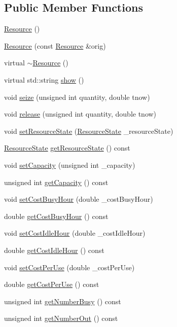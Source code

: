 \subsection*{Public Member Functions}
\begin{DoxyCompactItemize}
\item 
\hyperlink{class_resource_a5a87b23dc0327bbf8d53c6f38f637f48}{Resource} ()
\item 
\hyperlink{class_resource_a30f2ca8f0617a6628ebd246b14b50566}{Resource} (const \hyperlink{class_resource}{Resource} \&orig)
\item 
virtual \hyperlink{class_resource_a0e5ec475e2601bdb33644468e86f6f10}{$\sim$\-Resource} ()
\item 
virtual std\-::string \hyperlink{class_resource_a593cf83404dc90706943b4e60213fd01}{show} ()
\item 
void \hyperlink{class_resource_a4c9cc891367f2af07511d8897255d625}{seize} (unsigned int quantity, double tnow)
\item 
void \hyperlink{class_resource_ad5da4dca5dd48a4818827e6273c20c2d}{release} (unsigned int quantity, double tnow)
\item 
void \hyperlink{class_resource_aba60047e3a2400f2aec478b1cfa3647e}{set\-Resource\-State} (\hyperlink{class_resource_ad7a514f9a27e0010b59e147b8368970f}{Resource\-State} \-\_\-resource\-State)
\item 
\hyperlink{class_resource_ad7a514f9a27e0010b59e147b8368970f}{Resource\-State} \hyperlink{class_resource_ac832a54ae1e20a2f7137aefd3a5fc003}{get\-Resource\-State} () const 
\item 
void \hyperlink{class_resource_aa8530e4507ab493de34feb4fef7d4d03}{set\-Capacity} (unsigned int \-\_\-capacity)
\item 
unsigned int \hyperlink{class_resource_a0aa3a9287571af52be298611580e661e}{get\-Capacity} () const 
\item 
void \hyperlink{class_resource_a28c348f8562fcf63e174229e9001f55c}{set\-Cost\-Busy\-Hour} (double \-\_\-cost\-Busy\-Hour)
\item 
double \hyperlink{class_resource_a66bd7e365c6ccb088afad2a6f24afdae}{get\-Cost\-Busy\-Hour} () const 
\item 
void \hyperlink{class_resource_aee4482e9f914b0b4e83cdb4ada50e45e}{set\-Cost\-Idle\-Hour} (double \-\_\-cost\-Idle\-Hour)
\item 
double \hyperlink{class_resource_a8033fb963bed0116f01af2b637bd4cad}{get\-Cost\-Idle\-Hour} () const 
\item 
void \hyperlink{class_resource_adedf8ae8388efb1a194441613647b669}{set\-Cost\-Per\-Use} (double \-\_\-cost\-Per\-Use)
\item 
double \hyperlink{class_resource_a93d303fba82b1ef9879cc75fbafef506}{get\-Cost\-Per\-Use} () const 
\item 
unsigned int \hyperlink{class_resource_a6fafa0b8da75c9596ca52932482a5568}{get\-Number\-Busy} () const 
\item 
unsigned int \hyperlink{class_resource_a1aedd0bf239010a6b7e2a6c15a324481}{get\-Number\-Out} () const 
\end{DoxyCompactItemize}
